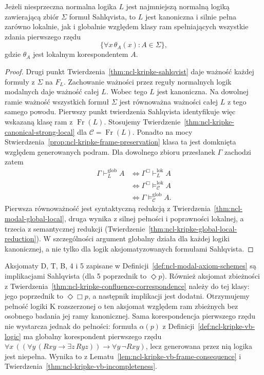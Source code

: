 \begin{wniosek}
\label{cor:ncl-kripke-sahlqvist-completeness}
Jeżeli niesprzeczna normalna logika $L$
jest najmniejszą normalną logiką zawierającą
zbiór $\Sigma$ formuł Sahlqvista, to $L$
jest kanoniczna i silnie pełna zarówno
lokalnie, jak i globalnie względem klasy
ram spełniających wszystkie zdania pierwszego rzędu
\[
 \{\forall x\,\theta_A(x): A\in\Sigma\},
\]
gdzie $\theta_A$ jest lokalnym korespondentem $A$.
\end{wniosek}
\begin{proof}
Drugi punkt
Twierdzenia~\ref{thm:ncl-kripke-sahlqvist}
daje ważność każdej formuły z $\Sigma$ na $F_L$.
Zachowanie ważności przez reguły normalnych
logik modalnych daje ważność całej $L$.
Wobec tego $L$ jest kanoniczna.
Na dowolnej ramie ważność wszystkich formuł
$\Sigma$ jest równoważna ważności całej $L$
z tego samego powodu. Pierwszy punkt twierdzenia
Sahlqvista identyfikuje więc wskazaną klasę ram
z $\operatorname{Fr}(L)$.
Stosujemy
Twierdzenie~\ref{thm:ncl-kripke-canonical-strong-local}
dla $\mathcal C=\operatorname{Fr}(L)$.
Ponadto na mocy
Stwierdzenia~\ref{prop:ncl-kripke-frame-preservation}
klasa ta jest domknięta względem generowanych
podram. Dla dowolnego zbioru przesłanek
$\Gamma$ zachodzi zatem
\[
\begin{aligned}
 \Gamma\vdash_L^{\mathrm{glob}}A
 &\iff\Gamma^\Box\vdash_L^{\mathrm{lok}}A\\
 &\iff\Gamma^\Box\models_{\mathcal C}^{\mathrm{lok}}A\\
 &\iff\Gamma\models_{\mathcal C}^{\mathrm{glob}}A.
\end{aligned}
\]
Pierwsza równoważność jest syntaktyczną
redukcją z
Twierdzenia~\ref{thm:ncl-modal-global-local},
druga wynika z silnej pełności i poprawności
lokalnej, a trzecia z semantycznej redukcji
(Twierdzenie~\ref{thm:ncl-kripke-global-local-reduction}).
W szczególności argument globalny działa
dla każdej logiki kanonicznej, a nie tylko
dla logik aksjomatyzowanych formułami
Sahlqvista.
\end{proof}

\begin{uwaga}
\label{rem:ncl-kripke-sahlqvist-scope}
Aksjomaty D, T, B, 4 i 5 zapisane w
Definicji~\ref{def:ncl-modal-axiom-schemes}
są implikacjami Sahlqvista (dla 5 poprzednik
to $\Diamond p$). Również aksjomat zbieżności
z Twierdzenia~\ref{thm:ncl-kripke-confluence-correspondence}
należy do tej klasy: jego poprzednik to
$\Diamond\Box p$, a następnik implikacji jest dodatni.
Otrzymujemy pełność logiki K rozszerzonej
o ten aksjomat względem ram zbieżnych
bez osobnego badania jej ramy kanonicznej.
Sama korespondencja pierwszego rzędu
nie wystarcza jednak do pełności:
formuła $\alpha(p)$ z
Definicji~\ref{def:ncl-kripke-vb-logic}
ma globalny korespondent pierwszego rzędu
$\forall x\,((\forall y\,(Rxy\to
\exists z\,Ryz))\to\forall y\,\neg Rxy)$,
lecz generowana przez nią logika jest
niepełna. Wynika to z
Lematu~\ref{lem:ncl-kripke-vb-frame-consequence}
i Twierdzenia~\ref{thm:ncl-kripke-vb-incompleteness}.
\end{uwaga}
